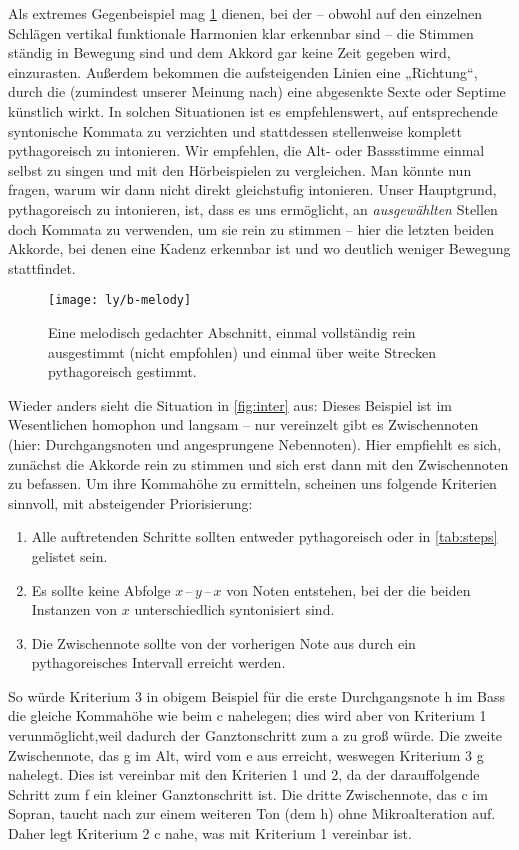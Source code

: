Als extremes Gegenbeispiel mag \cref{fig:melody} dienen, bei der – obwohl auf
den einzelnen Schlägen vertikal funktionale Harmonien klar erkennbar sind – die
Stimmen ständig in Bewegung sind und dem Akkord gar keine Zeit gegeben wird,
einzurasten. Außerdem bekommen die aufsteigenden Linien eine „Richtung“, durch
die (zumindest unserer Meinung nach) eine abgesenkte
Sexte oder Septime künstlich wirkt.  In solchen Situationen ist es
empfehlenswert, auf entsprechende syntonische Kommata zu verzichten und
stattdessen stellenweise komplett pythagoreisch zu intonieren.  Wir empfehlen,
die Alt- oder Bassstimme einmal selbst zu singen und mit den Hörbeispielen zu
vergleichen.  Man könnte nun fragen, warum wir dann nicht direkt gleichstufig
intonieren.  Unser Hauptgrund, pythagoreisch zu intonieren, ist, dass es uns
ermöglicht, an \emph{ausgewählten} Stellen doch Kommata zu verwenden, um sie
rein zu stimmen – hier die letzten beiden Akkorde, bei denen eine Kadenz
erkennbar ist und wo deutlich weniger Bewegung stattfindet.

\begin{figure}
  \centering
  \texttt{[image: ly/b-melody]}
  \caption{Eine melodisch gedachter Abschnitt, einmal
    vollständig rein ausgestimmt (nicht empfohlen) und einmal über weite
    Strecken pythagoreisch gestimmt.}\label{fig:melody}
\end{figure}

Wieder anders sieht die Situation in \cref{fig:inter} aus: Dieses Beispiel ist
im Wesentlichen homophon und langsam – nur vereinzelt gibt es Zwischennoten
(hier: Durchgangsnoten und angesprungene Nebennoten). Hier empfiehlt es sich,
zunächst die Akkorde rein zu stimmen und sich erst dann mit den Zwischennoten zu
befassen. Um ihre Kommahöhe zu ermitteln, scheinen uns folgende Kriterien
sinnvoll, mit absteigender Priorisierung:
\begin{enumerate}
\item Alle auftretenden Schritte sollten entweder pythagoreisch oder in \cref{tab:steps}
  gelistet sein.
\item Es sollte keine Abfolge $x$\,–\,$y$\,–\,$x$ von Noten entstehen, bei der
  die beiden Instanzen von $x$ unterschiedlich syntonisiert sind.
\item Die Zwischennote sollte von der vorherigen Note aus durch ein
  pythagoreisches Intervall erreicht werden.
\end{enumerate}
So würde Kriterium 3 in obigem Beispiel für die erste Durchgangsnote h im Bass
die gleiche Kommahöhe wie beim c nahelegen; dies wird aber von Kriterium 1
verunmöglicht,weil dadurch der Ganztonschritt zum \naturalm a zu groß würde. Die
zweite Zwischennote, das g im Alt, wird vom \naturalm e aus erreicht, weswegen
Kriterium 3 \naturalm g nahelegt. Dies ist vereinbar mit den Kriterien 1 und 2,
da der darauffolgende Schritt zum f ein kleiner Ganztonschritt ist. Die dritte
Zwischennote, das c im Sopran, taucht nach zur einem weiteren Ton (dem \naturalm
h) ohne Mikroalteration auf. Daher legt Kriterium 2 \natural c nahe, was mit
Kriterium 1 vereinbar ist.

